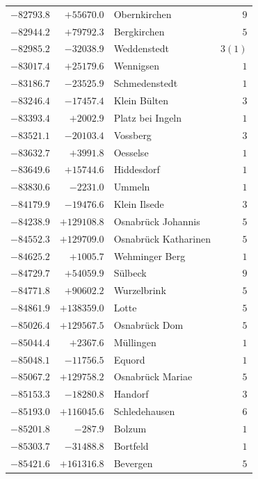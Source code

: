 \begin{center}
\begin{tabular}{r|r|p{170pt}|r}
\(-82793.8\)&\(+55670.0\)&Obernkirchen&\(9\)\\
\(-82944.2\)&\(+79792.3\)&Bergkirchen&\(5\)\\
\(-82985.2\)&\(-32038.9\)&Weddenstedt&\(3 (1)\)\\
\(-83017.4\)&\(+25179.6\)&Wennigsen&\(1\)\\
\(-83186.7\)&\(-23525.9\)&Schmedenstedt&\(1\)\\
\(-83246.4\)&\(-17457.4\)&Klein Bülten&\(3\)\\
\(-83393.4\)&\(+2002.9\)&Platz bei Ingeln&\(1\)\\
\(-83521.1\)&\(-20103.4\)&Vossberg&\(3\)\\
\(-83632.7\)&\(+3991.8\)&Oesselse&\(1\)\\
\(-83649.6\)&\(+15744.6\)&Hiddesdorf&\(1\)\\
\(-83830.6\)&\(-2231.0\)&Ummeln&\(1\)\\
\(-84179.9\)&\(-19476.6\)&Klein Ilsede&\(3\)\\
\(-84238.9\)&\(+129108.8\)&Osnabrück Johannis&\(5\)\\
\(-84552.3\)&\(+129709.0\)&Osnabrück Katharinen&\(5\)\\
\(-84625.2\)&\(+1005.7\)&Wehminger Berg&\(1\)\\
\(-84729.7\)&\(+54059.9\)&Sülbeck&\(9\)\\
\(-84771.8\)&\(+90602.2\)&Wurzelbrink&\(5\)\\
\(-84861.9\)&\(+138359.0\)&Lotte&\(5\)\\
\(-85026.4\)&\(+129567.5\)&Osnabrück Dom&\(5\)\\
\(-85044.4\)&\(+2367.6\)&Müllingen&\(1\)\\
\(-85048.1\)&\(-11756.5\)&Equord&\(1\)\\
\(-85067.2\)&\(+129758.2\)&Osnabrück Mariae&\(5\)\\
\(-85153.3\)&\(-18280.8\)&Handorf&\(3\)\\
\(-85193.0\)&\(+116045.6\)&Schledehausen&\(6\)\\
\(-85201.8\)&\(-287.9\)&Bolzum&\(1\)\\
\(-85303.7\)&\(-31488.8\)&Bortfeld&\(1\)\\
\(-85421.6\)&\(+161316.8\)&Bevergen&\(5\)\\
\hline\end{tabular}\endgroup\end{center}
\clearpage
